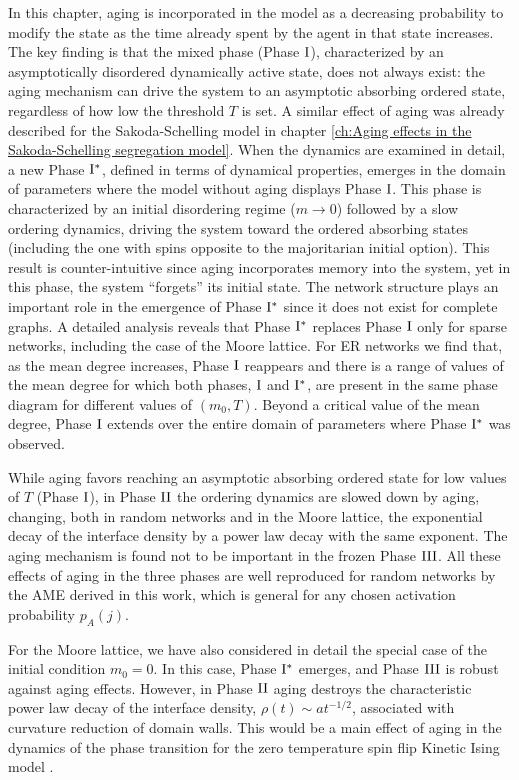 In this chapter, aging is incorporated in the model as a decreasing probability to modify the state as the time already spent by the agent in that state increases. The key finding is that the mixed phase (Phase ${\rm I}$), characterized by an asymptotically disordered dynamically active state, does not always exist: the aging mechanism can drive the system to an asymptotic absorbing ordered state, regardless of how low the threshold $T$ is set. A similar effect of aging was already described for the Sakoda-Schelling model in chapter \ref{ch:Aging effects in the Sakoda-Schelling segregation model}. When the dynamics are examined in detail, a new Phase ${\rm I}^{*}$, defined in terms of dynamical properties, emerges in the domain of parameters where the model without aging displays Phase ${\rm I}$. This phase is characterized by an initial disordering regime ($m \to 0$) followed by a slow ordering dynamics, driving the system toward the ordered absorbing states (including the one with spins opposite to the majoritarian initial option). This result is counter-intuitive since aging incorporates memory into the system, yet in this phase, the system ``forgets'' its initial state. The network structure plays an important role in the emergence of Phase ${\rm I}^{*}$ since it does not exist for complete graphs. A detailed analysis reveals that Phase ${\rm I}^{*}$ replaces Phase ${\rm I}$ only for sparse networks, including the case of the Moore lattice. For ER networks we find that, as the mean degree increases, Phase ${\rm I}$ reappears and there is a range of values of the mean degree for which both phases, ${\rm I}$ and ${\rm I}^{*}$, are present in the same phase diagram for different values of $(m_0,T)$. Beyond a critical value of the mean degree, Phase ${\rm I}$ extends over the entire domain of parameters where Phase ${\rm I}^{*}$ was observed.

While aging favors reaching an asymptotic absorbing ordered state for low values of $T$ (Phase ${\rm I}$), in Phase ${\rm II}$ the ordering dynamics are slowed down by aging, changing, both in random networks and in the Moore lattice, the exponential decay of the interface density by a power law decay with the same exponent. The aging mechanism is found not to be important in the frozen Phase ${\rm III}$. All these effects of aging in the three phases are well reproduced for random networks by the AME derived in this work, which is general for any chosen activation probability $p_A (j)$.

For the Moore lattice, we have also considered in detail the special case of the initial condition $m_0=0$. In this case, Phase ${\rm I}^{*}$ emerges, and Phase ${\rm III}$ is robust against aging effects. However, in Phase ${\rm II}$ aging destroys the characteristic power law decay of the interface density, $\rho(t) \sim at^{-1/2}$, associated with curvature reduction of domain walls. This would be a main effect of aging in the dynamics of the phase transition for the zero temperature spin flip Kinetic Ising model \cite{Maxi}.

